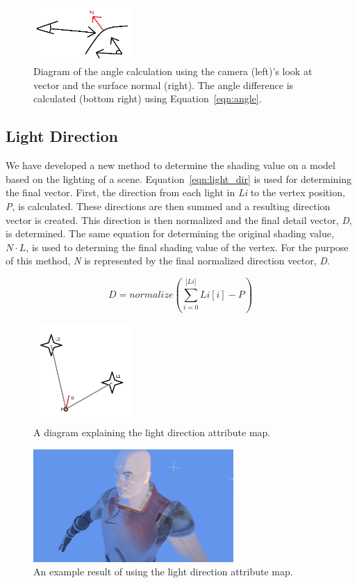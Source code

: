 \documentclass[annual]{acmsiggraph}
\begin{document}
\begin{figure}[h]
	\centering
	\includegraphics[width=1.5in]{images/angle}
	\caption{Diagram of the angle calculation using the camera (left)'s look at vector and the surface normal (right). The angle difference is calculated (bottom right) using Equation~\ref{eqn:angle}.}
	\label{fig:angle}
\end{figure}

\subsection{Light Direction}
\label{sec:light_dir}
We have developed a new method to determine the shading value on a model based on the lighting of a scene. Equation~\ref{eqn:light_dir} is used for determining the final vector. First, the direction from each light in {\it{Li}} to the vertex position, {\it{P}}, is calculated. These directions are then summed and a resulting direction vector is created. This direction is then normalized and the final detail vector, {\it{D}}, is determined. The same equation for determining the original shading value, $N\cdot L$, is used to determing the final shading value of the vertex. For the purpose of this method, {\it{N}} is represented by the final normalized direction vector, {\it{D}}. 

\begin{equation}
\label{eqn:light_dir}
D = normalize({\sum_{i=0}^{|Li|} Li[i] - P})
\end{equation}

\begin{figure}[h]
	\centering
	\includegraphics[width=1.5in]{images/light_detail}
	\caption{A diagram explaining the light direction attribute map.}
	\label{fig:lightDirection}
\end{figure}

\begin{figure}[h]
	\centering
	\includegraphics[width=3.0in]{images/light_directions}
	\caption{An example result of using the light direction attribute map.}
	\label{fig:lightDirectionResult}
\end{figure}
\end{document}
